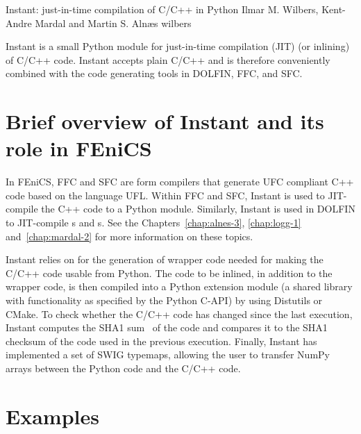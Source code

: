               {Instant: just-in-time compilation of C/C++ in Python}
              {Ilmar M. Wilbers, Kent-Andre Mardal and Martin S. Aln{\ae}s}
              {wilbers}

Instant is a small Python module for just-in-time compilation
(JIT) (or inlining) of C/C++ code.  Instant accepts plain
C/C++ and is therefore conveniently combined with the code generating
tools in DOLFIN, FFC, and SFC.

\section{Brief overview of Instant and its role in FEniCS}

In FEniCS, FFC and SFC are form compilers that generate UFC compliant C++
code based on the language UFL.  Within FFC and SFC, Instant is used to
JIT-compile the C++ code to a Python module.  Similarly, Instant is used
in DOLFIN to JIT-compile s and s.  See the
Chapters~\ref{chap:alnes-3}, \ref{chap:logg-1} and~\ref{chap:mardal-2}
for more information on these topics.

Instant relies on \citet{www:swig,Beazley2006} for the generation of
wrapper code needed for making the C/C++ code usable from Python.  The
code to be inlined, in addition to the wrapper code, is then compiled
into a Python extension module (a shared library with functionality as
specified by the Python C-API) by using Distutils or CMake. To check
whether the C/C++ code has changed since the last execution, Instant
computes the SHA1 sum~\citep{HansenWollman} of the code and compares
it to the SHA1 checksum of the code used in the previous
execution. Finally, Instant has implemented a set of
SWIG typemaps, allowing the user to transfer NumPy
arrays between the Python code and the C/C++ code.

\section{Examples}

\label{wilbers:sec:examples}
